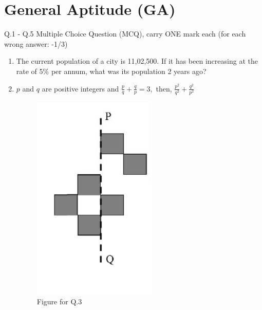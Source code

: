 \documentclass[journal]{IEEEtran}
\begin{document}
\section{General Aptitude (GA)}
Q.1 - Q.5 Multiple Choice Question (MCQ), carry ONE mark each (for each wrong answer: -1/3)
\bigskip
\begin{enumerate}[start=1]
	\item The current population of a city is 11,02,500. If it has been increasing at the rate of 5\% per annum, what was its population 2 years ago?
    \hfill{}
\begin{enumerate}
\end{enumerate}

\item  $p$ and $q$ are positive integers and  $\frac{p}{q} + \frac{q}{p} = 3,$ then, $\frac{p^2}{q^2} + \frac{q^2}{p^2}$
\hfill{}
\begin{enumerate}
\end{enumerate}

\setcounter{figure}{0}
\begin{figure}[H]
    \centering
    \includegraphics[width=0.3\columnwidth]{figs/image_1.png}
    \caption{Figure for Q.3}
    \label{Figure1}
\end{figure}


\end{enumerate}
\end{document}
